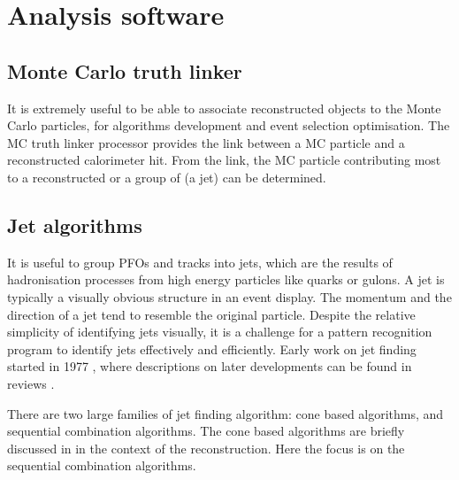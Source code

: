 \section{Analysis software}


\subsection{Monte Carlo truth linker}
\label{sec:pandoraMCtruthLink}
It is extremely useful to be able to associate reconstructed objects to the Monte Carlo particles, for algorithms development and  event selection optimisation. The MC truth linker processor provides the link between a MC particle and a  reconstructed calorimeter hit. From the link, the MC particle contributing most to a reconstructed \PFO or a group of \PFOs (a jet) can be determined.

\subsection{Jet algorithms}
\label{sec:pandoraJetAlg}


It is useful to group PFOs and tracks into jets, which are the results of hadronisation processes from high energy particles like quarks or gulons. A jet is typically a visually obvious structure in an event display. The momentum and the direction of a jet tend to resemble the original particle. Despite the relative simplicity of identifying jets visually, it is a challenge for a pattern recognition program to identify jets effectively and efficiently. Early work on jet finding started in 1977 \cite{Sterman:1977wj}, where descriptions on later developments can be found in reviews \cite{Moretti:1998qx,Salam:2009jx,Ali:2010tw}.

There are two large families of jet finding algorithm: cone based algorithms, and sequential combination algorithms. The cone based algorithms are briefly discussed in  in the context of the \pandora reconstruction. Here the focus is on the sequential combination algorithms.

